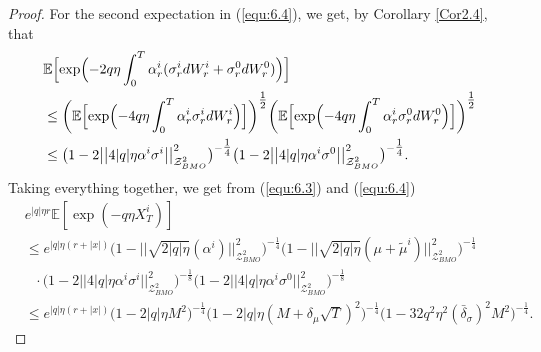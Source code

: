\documentclass[10pt,a4paper]{article}
\theoremstyle{plain}
\theoremstyle{definition}
\numberwithin{equation}{section}
\begin{document}
\begin{proof}
For the second expectation in (\ref{equ:6.4}), we get, by Corollary \ref{Cor2.4}, that
\begin{align*}
&\mathbb{E}\Bigl[\exp\Bigl(-2q\eta\int_{0}^{T}\alpha_{r}^{i}(\sigma_{r}^{i}dW_{r}^{i}+\sigma_{r}^{0}dW_{r}^{0})\Bigr)\Bigr] \\
&\leq \biggl(\mathbb{E}\Bigl[\exp\Bigl(-4q\eta\int_{0}^{T}\alpha_{r}^{i}\sigma_{r}^{i}dW_{r}^{i}\Bigr)\Bigr]\biggr)^{\tfrac{1}{2}}\biggl(\mathbb{E}\Bigl[\exp\Bigl(-4q\eta\int_{0}^{T}\alpha_{r}^{i}\sigma_{r}^{0}dW_{r}^{0}\Bigr)\Bigr]\biggr)^{\tfrac{1}{2}} \\
&\leq \big(1-2\big|\big|4|q|\eta\alpha^{i}\sigma^{i}\big|\big|_{\mathcal{Z}_{BMO}^{2}}^{2}\big)^{-\tfrac{1}{4}}\big(1-2\big|\big|4|q|\eta\alpha^{i}\sigma^{0}\big|\big|_{\mathcal{Z}_{BMO}^{2}}^{2}\big)^{-\tfrac{1}{4}}.
\end{align*}
Taking everything together, 
we get from (\ref{equ:6.3}) and (\ref{equ:6.4})
\begin{align*}
&e^{|q|\eta r}\mathbb{E}[\exp(-{q\eta}X_{T}^{i})] \\
&\leq e^{|q|\eta(r+|x|)}\big(1-\big|\big|\sqrt{2|q|\eta}(\alpha^{i})\big|\big|_{\mathcal{Z}_{BMO}^{2}}^{2}\big)^{-\tfrac{1}{4}}\big(1-\big|\big|\sqrt{2|q|\eta}(\mu+\tilde{\mu}^{i})\big|\big|_{\mathcal{Z}_{BMO}^{2}}^{2}\big)^{-\tfrac{1}{4}}\\
&\ \ \ \cdot \big(1-2\big|\big|4|q|\eta\alpha^{i}\sigma^{i}\big|\big|_{\mathcal{Z}_{BMO}^{2}}^{2}\big)^{-\tfrac{1}{8}}\big(1-2\big|\big|4|q|\eta\alpha^{i}\sigma^{0}\big|\big|_{\mathcal{Z}_{BMO}^{2}}^{2}\big)^{-\tfrac{1}{8}} \\
&\leq e^{|q|\eta(r+|x|)}\big(1-2|q|\eta M^{2}\big)^{-\tfrac{1}{4}}\big(1-2|q|\eta (M+\delta_{\mu}\sqrt{T})^{2}\big)^{-\tfrac{1}{4}}\big(1-32q^{2}\eta^{2}(\bar{\delta}_{\sigma})^{2}M^{2}\big)^{-\tfrac{1}{4}}.
\end{align*}


\end{proof}
\end{document}
